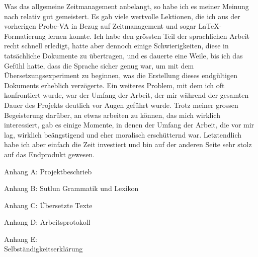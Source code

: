 \documentclass{article}
\begin{document}
Was das allgemeine Zeitmanagement anbelangt, so habe ich es meiner Meinung nach relativ gut gemeistert.
Es gab viele wertvolle Lektionen, die ich aus der vorherigen Probe-VA in Bezug auf Zeitmanagement
und sogar \LaTeX-Formatierung lernen konnte. Ich habe den grössten Teil der sprachlichen Arbeit recht
schnell erledigt, hatte aber dennoch einige Schwierigkeiten, diese in tatsächliche Dokumente zu übertragen,
und es dauerte eine Weile, bis ich das Gefühl hatte, dass die Sprache sicher genug war,
um mit dem Übersetzungsexperiment zu beginnen, was die Erstellung dieses endgültigen Dokuments erheblich verzögerte.
Ein weiteres Problem, mit dem ich oft konfrontiert wurde, war der Umfang der Arbeit,
der mir während der gesamten Dauer des Projekts deutlich vor Augen geführt wurde.
Trotz meiner grossen Begeisterung darüber, an etwas arbeiten zu können, das mich wirklich interessiert,
gab es einige Momente, in denen der Umfang der Arbeit, die vor mir lag, wirklich beängstigend und eher
moralisch erschütternd war. Letztendlich habe ich aber einfach die Zeit investiert und bin auf der anderen
Seite sehr stolz auf das Endprodukt gewesen.







\renewcommand{\section}[1]{\newpage\vspace*{\fill}\Huge{#1}\vspace*{\fill}}

\section{Anhang A: Projektbeschrieb}


\section{Anhang B: Sutlun Grammatik und Lexikon}


\section{Anhang C: Übersetzte Texte}


\section{Anhang D: Arbeitsprotokoll}


\section{Anhang E: \\Selbständigkeitserklärung}

\end{document}
